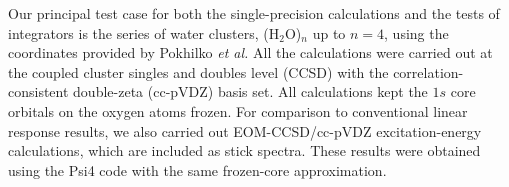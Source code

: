 Our principal test case for both the single-precision calculations and the tests
of integrators is the series of water clusters, (H$_2$O)$_n$ up to $n=4$, using
the coordinates provided by Pokhilko \textit{et al.}\cite{Pokhilko2018} All the
calculations were carried out at the coupled cluster singles and doubles level
(CCSD) with the correlation-consistent double-zeta (cc-pVDZ) basis
set.\cite{Dunning1989}  All calculations kept the $1s$ core orbitals on the oxygen
atoms frozen.  For comparison to conventional linear response results, we also
carried out EOM-CCSD/cc-pVDZ excitation-energy calculations, which are included
as stick spectra.  These results were obtained using the Psi4 code\cite{Smith2020}
with the same frozen-core approximation.

